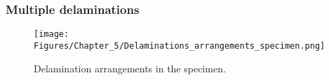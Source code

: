 \subsubsection{Multiple delaminations}
\label{sec5322}

\begin{figure} [h!]
	\centering
	\texttt{[image: Figures/Chapter\_5/Delaminations\_arrangements\_specimen.png]}
	\caption{Delamination arrangements in the specimen.}
	\label{fig:Delaminations_arrangements_specimen}
\end{figure}

